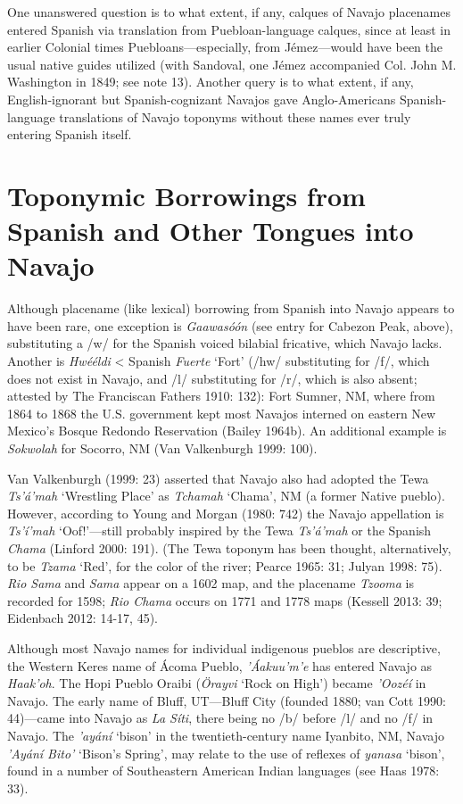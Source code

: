   One unanswered question is to what extent, if any, calques of Navajo placenames entered Spanish via translation from Puebloan-language calques, since at least in earlier Colonial times Puebloans—especially, from Jémez—would have been the usual native guides utilized (with Sandoval, one Jémez accompanied Col. John M. Washington in 1849; see note 13).  Another query is to what extent, if any, English-ignorant but Spanish-cognizant Navajos gave Anglo-Americans Spanish-language translations of Navajo toponyms without these names ever truly entering Spanish itself.

\section{Toponymic Borrowings from Spanish and Other Tongues into Navajo}\label{jett:sec:6}
Although placename (like lexical) borrowing from Spanish into Navajo appears to have been rare, one exception is \textit{Gaawasóón} (see entry for Cabezon Peak, above), substituting a /w/ for the Spanish voiced bilabial fricative, which Navajo lacks.  Another is \textit{Hwééldi }{\textless} Spanish \textit{Fuerte }‘Fort’ (/hw/ substituting for /f/, which does not exist in Navajo, and\textit{ }/l/ substituting for /r/, which is also absent; attested by The Franciscan Fathers 1910: 132): Fort Sumner, NM, where from 1864 to 1868 the U.S. government kept most Navajos interned on eastern New Mexico’s Bosque Redondo Reservation (Bailey 1964b).  An additional example is \textit{Sokwolah} for Socorro, NM (Van Valkenburgh 1999: 100).

Van Valkenburgh (1999: 23) asserted that Navajo also had adopted the Tewa \textit{Ts’á’mah} ‘Wrestling Place’ as \textit{Tchamah} ‘Chama’, NM (a former Native pueblo).  However, according to Young and Morgan (1980: 742) the Navajo appellation is \textit{Ts’í’mah} ‘Oof!’—still probably inspired by the Tewa \textit{Ts’á’mah} or the Spanish \textit{Chama} (Linford 2000: 191).  (The Tewa toponym has been thought, alternatively, to be \textit{Tzama} ‘Red’, for the color of the river; Pearce 1965: 31; Julyan 1998: 75).  \textit{Rio Sama} and \textit{Sama} appear on a 1602 map, and the placename \textit{Tzooma} is recorded for 1598; \textit{Rio Chama} occurs on 1771 and 1778 maps (Kessell 2013: 39; Eidenbach 2012: 14-17, 45).

Although most Navajo names for individual indigenous pueblos are descriptive, the Western Keres name of Ácoma Pueblo, \textit{’Áakuu’m’e} has entered Navajo as \textit{Haak’oh}.  The Hopi Pueblo Oraibi (\textit{Örayvi} ‘Rock on High’) became \textit{’Oozéí} in Navajo.  The early name of Bluff, UT—Bluff City (founded 1880; van Cott 1990: 44)—came into Navajo as \textit{La Síti}, there being no /b/ before /l/ and no /f/ in Navajo.  The \textit{’ayání} ‘bison’ in the twentieth-century name  Iyanbito, NM, Navajo \textit{’Ayání Bito’}  ‘Bison’s Spring’, may relate to the use of reflexes of \textit{yanasa} ‘bison’, found in a number of Southeastern American Indian languages (see Haas 1978: 33).


